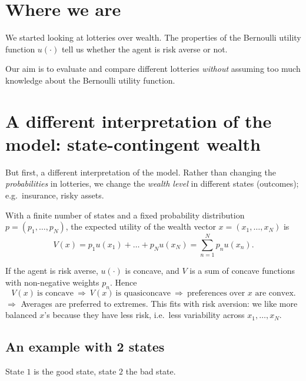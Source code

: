 \documentclass[11pt]{article}
\begin{document}


\section{Where we are}

We started looking at lotteries over wealth. The properties of the Bernoulli utility
function $u(\cdot)$ tell us whether the agent is risk averse or not.

Our aim is to evaluate and compare different lotteries \emph{without} assuming too much
knowledge about the Bernoulli utility function.


\section{A different interpretation of the model: state-contingent wealth}

But first, a different interpretation of the model. Rather than changing the
\emph{probabilities} in lotteries, we change the \emph{wealth level} in different
states (outcomes); e.g.\ insurance, risky assets.

With a finite number of states and a fixed probability distribution
$p=(p_1,\dots,p_N)$, the expected utility of the wealth vector $x=(x_1,\dots,x_N)$ is
\[ V(x)=p_1u(x_1)+\dots+p_Nu(x_N)=\sum_{n=1}^{N}p_n u(x_n). \]

If the agent is risk averse, $u(\cdot)$ is concave, and $V$ is a sum of concave
functions with non-negative weights $p_n$. Hence
\[ V(x)\ \text{is concave}\ \Rightarrow\ V(x)\ \text{is quasiconcave}\
   \Rightarrow\ \text{preferences over } x \text{ are convex.} \]
$\Rightarrow$ Averages are preferred to extremes. This fits with risk aversion: we like
more balanced $x$'s because they have less risk, i.e.\ less variability across
$x_1,\dots,x_N$.

\subsection*{An example with 2 states}

State $1$ is the good state, state $2$ the bad state.
\end{document}
